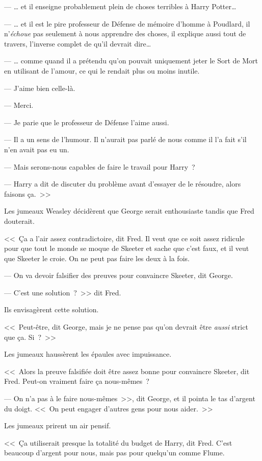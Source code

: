 --- … et il enseigne probablement plein de choses terribles à Harry Potter…

--- … et il est le pire professeur de Défense de mémoire d'homme à Poudlard, il n'\emph{échoue} pas seulement à nous apprendre des choses, il explique aussi tout de travers, l'inverse complet de qu'il devrait dire…

--- … comme quand il a prétendu qu'on pouvait uniquement jeter le Sort de Mort en utilisant de l'amour, ce qui le rendait plus ou moins inutile.

--- J'aime bien celle-là.

--- Merci.

--- Je parie que le professeur de Défense l'aime aussi.

--- Il a un sens de l'humour. Il n'aurait pas parlé de nous comme il l'a fait s'il n'en avait pas eu un.

--- Mais serons-nous capables de faire le travail pour Harry~?

--- Harry a dit de discuter du problème avant d'essayer de le résoudre, alors faisons ça.~>>

Les jumeaux Weasley décidèrent que George serait enthousiaste tandis que Fred douterait.

<<~Ça a l'air assez contradictoire, dit Fred. Il veut que ce soit assez ridicule pour que tout le monde se moque de Skeeter et sache que c'est faux, et il veut que Skeeter le croie. On ne peut pas faire les deux à la fois.

--- On va devoir falsifier des preuves pour convaincre Skeeter, dit George.

--- C'est une solution~?~>> dit Fred.

Ils envisagèrent cette solution.

<<~Peut-être, dit George, mais je ne pense pas qu'on devrait être \emph{aussi} strict que ça. Si~?~>>

Les jumeaux haussèrent les épaules avec impuissance.

<<~Alors la preuve falsifiée doit être assez bonne pour convaincre Skeeter, dit Fred. Peut-on vraiment faire ça nous-mêmes~?

--- On n'a pas à le faire nous-mêmes~>>, dit George, et il pointa le tas d'argent du doigt. <<~On peut engager d'autres gens pour nous aider.~>>

Les jumeaux prirent un air pensif.

<<~Ça utiliserait presque la totalité du budget de Harry, dit Fred. C'est beaucoup d'argent pour nous, mais pas pour quelqu'un comme Flume.

